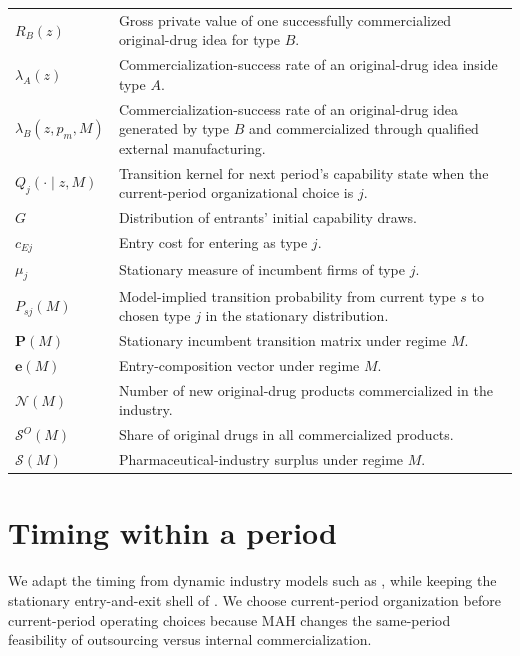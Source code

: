 \documentclass[12pt]{article}
\newcommand{\1}{\mathbf{1}}
\newcommand{\Inew}{\mathcal{N}}
\newcommand{\ShareO}{\mathcal{S}^O}
\newcommand{\Surp}{\mathcal{S}}
\begin{document}
\begin{longtable}{p{}p{}}
$R_B(z)$ & Gross private value of one successfully commercialized original-drug idea for type $B$. \\
$\lambda_A(z)$ & Commercialization-success rate of an original-drug idea inside type $A$. \\
$\lambda_B(z,p_m,M)$ & Commercialization-success rate of an original-drug idea generated by type $B$ and commercialized through qualified external manufacturing. \\
$Q_j(\cdot\mid z,M)$ & Transition kernel for next period's capability state when the current-period organizational choice is $j$. \\
$G$ & Distribution of entrants' initial capability draws. \\
$c_{Ej}$ & Entry cost for entering as type $j$. \\
$\mu_j$ & Stationary measure of incumbent firms of type $j$. \\
$P_{sj}(M)$ & Model-implied transition probability from current type $s$ to chosen type $j$ in the stationary distribution. \\
$\mathbf P(M)$ & Stationary incumbent transition matrix under regime $M$. \\
$\mathbf e(M)$ & Entry-composition vector under regime $M$. \\
$\Inew(M)$ & Number of new original-drug products commercialized in the industry. \\
$\ShareO(M)$ & Share of original drugs in all commercialized products. \\
$\Surp(M)$ & Pharmaceutical-industry surplus under regime $M$. \\
\bottomrule
\end{longtable}

\section{Timing within a period}

We adapt the timing from dynamic industry models such as \citet{EricsonPakes1995}, while keeping the stationary entry-and-exit shell of \citet{Hopenhayn1992}. We choose current-period organization before current-period operating choices because MAH changes the same-period feasibility of outsourcing versus internal commercialization.
\end{document}
